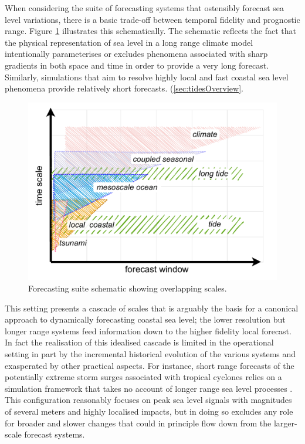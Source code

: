 When considering the suite of forecasting systems that ostensibly forecast sea level variations, there is a basic trade-off between temporal fidelity and prognostic range.    Figure \ref{fig:forecastScalesAll} illustrates this schematically.    The schematic reflects the fact that the physical representation of sea level in a long range climate model intentionally parameterises or excludes phenomena associated with sharp gradients in both space and time in order to provide a very long forecast.  Similarly, simulations that aim to resolve highly local and fast coastal sea level phenomena provide relatively short forecasts.    
(\ref{sec:tidesOverview}.    
\begin{figure}[!hbt]\centering
  \includegraphics[width=\figwidthBig]{figures/diagrams/scales.pdf}
  \caption{Forecasting suite schematic showing overlapping scales.}
  \label{fig:forecastScalesAll}
\end{figure}
This setting presents a cascade of scales that is arguably the basis for a canonical approach to dynamically forecasting coastal sea level; the lower resolution but longer range systems feed information down to the higher fidelity local forecast.    In fact the realisation of this idealised cascade is limited in the operational setting in part by the incremental historical evolution of the various systems and exasperated by other practical aspects.
For instance, short range forecasts of the potentially extreme storm surges associated with tropical cyclones relies on a simulation framework that takes no account of longer range sea level processes \citep{BRR-031}.   This configuration reasonably focuses on peak sea level signals with magnitudes of several meters and highly localised impacts, but in doing so excludes any role for broader and slower changes that could in principle flow down from the larger-scale forecast systems.

